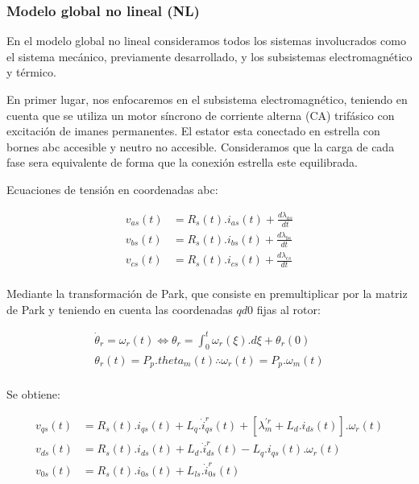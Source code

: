 \documentclass{article}
\begin{document}
\subsubsection{Modelo global no lineal (NL)}

En el modelo global no lineal consideramos todos los sistemas involucrados 
como el sistema mecánico, previamente desarrollado, 
y los subsistemas electromagnético y térmico.

En primer lugar, nos enfocaremos en el subsistema electromagnético, teniendo en cuenta que 
se utiliza un motor síncrono de corriente alterna (CA) trifásico con excitación de imanes 
permanentes. El estator esta conectado en estrella con bornes abc accesible y neutro no accesible.
Consideramos que la carga de cada fase sera equivalente de forma que la conexión estrella este equilibrada.

Ecuaciones de tensión en coordenadas abc:

\begin{equation}
    \begin{aligned}
        v_{as}(t) &= R_{s}(t).i_{as}(t) + \frac{d\lambda_{as}}{dt}\\
        v_{bs}(t) &= R_{s}(t).i_{bs}(t) + \frac{d\lambda_{bs}}{dt}\\
        v_{cs}(t) &= R_{s}(t).i_{cs}(t) + \frac{d\lambda_{cs}}{dt}\\
    \end{aligned}
\end{equation}

Mediante la transformación de Park, que consiste en premultiplicar por la matriz de Park y teniendo en 
cuenta las coordenadas $qd0$ fijas al rotor:

\begin{equation}
    \begin{aligned}
        \dot{\theta}_r = \omega_r(t) \Leftrightarrow  \theta_r = \int_0^t \omega_r(\xi).d\xi + \theta_r(0)\\
        \theta_r(t) = P_p.theta_m(t) \therefore \omega_r(t) = P_p.\omega_m(t)\\
    \end{aligned}
\end{equation}

Se obtiene:

\begin{equation}\label{eq.tensiones_qd0}
    \begin{aligned}
        v_{qs}(t) &= R_{s}(t).i_{qs}(t) + L_{q}.\dot{i}_{qs}^r(t) + [\lambda_{m}^{\prime r} + L_{d}.i_{ds}(t)].\omega_{r}(t)\\
        v_{ds}(t) &= R_{s}(t).i_{ds}(t) + L_{d}.\dot{i}_{ds}^r(t)  - L_{q}.i_{qs}(t).\omega_{r}(t)\\
        v_{0s}(t) &= R_{s}(t).i_{0s}(t) + L_{ls}.\dot{i}_{0s}^r(t)
    \end{aligned}
\end{equation}
\end{document}
